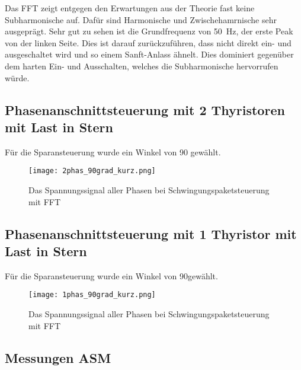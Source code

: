 Das FFT zeigt entgegen den Erwartungen aus der Theorie fast keine Subharmonische auf. Dafür sind Harmonische und Zwischehamrnische sehr ausgeprägt. Sehr gut zu sehen ist die Grundfrequenz von \SI{50}{Hz}, der erste Peak von der linken Seite. Dies ist darauf zurückzuführen, dass nicht direkt ein- und ausgeschaltet wird und so einem Sanft-Anlass ähnelt. Dies dominiert gegenüber dem harten Ein- und Ausschalten, welches die Subharmonische hervorrufen würde.
\newpage
\subsection{Phasenanschnittsteuerung mit 2 Thyristoren mit Last in Stern}
Für die Sparansteuerung wurde ein Winkel von 90\textdegree \hspace{0.02cm} gewählt. 

\begin{figure}[ht!]
	\centering
	\texttt{[image: 2phas\_90grad\_kurz.png]}	
	\caption{Das Spannungssignal aller Phasen bei Schwingungspaketsteuerung mit FFT}\label{fig:Mess_2phas_kurz}
\end{figure}


\subsection{Phasenanschnittsteuerung mit 1 Thyristor mit Last in Stern}
Für die Sparansteuerung wurde ein Winkel von 90\textdegree gewählt. 

\begin{figure}[ht!]
	\centering
	\texttt{[image: 1phas\_90grad\_kurz.png]}	
	\caption{Das Spannungssignal aller Phasen bei Schwingungspaketsteuerung mit FFT}\label{fig:Mess_1phas_kurz}
\end{figure}



\subsection{Messungen ASM}

